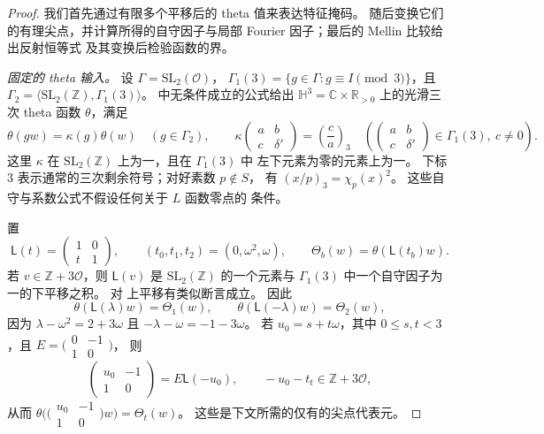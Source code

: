 \begin{proof}
我们首先通过有限多个平移后的 theta 值来表达特征掩码。
随后变换它们的有理尖点，并计算所得的自守因子与局部
Fourier 因子；最后的 Mellin 比较给出反射恒等式
及其变换后检验函数的界。

\emph{固定的 theta 输入。}
设 $\Gamma=\mathrm{SL}_2(\mathcal O)$，
$\Gamma_1(3)=\{g\in\Gamma:g\equiv I\pmod3\}$，且
$\Gamma_2=\langle\mathrm{SL}_2(\mathbb Z),\Gamma_1(3)\rangle$。
\cite[方程 (5.4)、(5.7)、(5.9) 与 (5.12)--(5.17)]{DR}
中无条件成立的公式给出
$\mathbb H^3=\mathbb C\times\mathbb R_{>0}$ 上的光滑三次 theta 函数 $\theta$，满足
\[
 \theta(gw)=\kappa(g)\theta(w)\quad(g\in\Gamma_2),\qquad
 \kappa\!\begin{pmatrix}a&b\\c&\delta'\end{pmatrix}
   =\left(\frac ca\right)_3\quad
   \left(\begin{pmatrix}a&b\\c&\delta'\end{pmatrix}\in\Gamma_1(3),\ c\ne0\right).
\]
这里 $\kappa$ 在 $\mathrm{SL}_2(\mathbb Z)$ 上为一，且在 $\Gamma_1(3)$ 中
左下元素为零的元素上为一。 下标 $3$
表示通常的三次剩余符号；对好素数 $p\notin S$，
有 $(x/p)_3=\chi_p(x)^2$。
这些自守与系数公式不假设任何关于 $L$ 函数零点的
条件。

置
\[
 \mathsf L(t)=\begin{pmatrix}1&0\\t&1\end{pmatrix},\qquad
 (t_0,t_1,t_2)=(0,\omega^2,\omega),\qquad
 \Theta_b(w)=\theta(\mathsf L(t_b)w).
\]
若 $v\in\mathbb Z+3\mathcal O$，则 $\mathsf L(v)$ 是
$\mathrm{SL}_2(\mathbb Z)$ 的一个元素与
$\Gamma_1(3)$ 中一个自守因子为一的下平移之积。 对
上平移有类似断言成立。 因此
\[
 \theta(\mathsf L(\lambda)w)=\Theta_1(w),\qquad
 \theta(\mathsf L(-\lambda)w)=\Theta_2(w),
\]
因为 $\lambda-\omega^2=2+3\omega$ 且
$-\lambda-\omega=-1-3\omega$。 若 $u_0=s+t\omega$，其中
$0\le s,t<3$，且 $E=\bigl(\begin{smallmatrix}0&-1\\1&0\end{smallmatrix}\bigr)$，
则
\[
 \begin{pmatrix}u_0&-1\\1&0\end{pmatrix}=E\mathsf L(-u_0),
 \qquad -u_0-t_t\in\mathbb Z+3\mathcal O,
\]
从而 $\theta\bigl(\bigl(\begin{smallmatrix}u_0&-1\\1&0\end{smallmatrix}\bigr)w\bigr)
=\Theta_t(w)$。 这些是下文所需的仅有的尖点代表元。


\end{proof}
